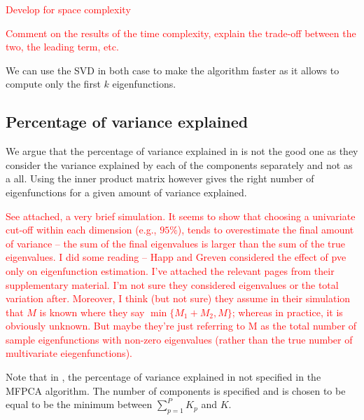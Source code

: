 \textcolor{red}{Develop for space complexity}

\textcolor{red}{Comment on the results of the time complexity, explain the trade-off between the two, the leading term, etc.}

\begin{remark}
We can use the SVD in both case to make the algorithm faster as it allows to compute only the first $k$ eigenfunctions.
\end{remark}


\subsection{Percentage of variance explained} %
\label{sub:percentage_of_variance_explained}

We argue that the percentage of variance explained in \cite{happMultivariateFunctionalPrincipal2015} is not the good one as they consider the variance explained by each of the components separately and not as a all. Using the inner product matrix however gives the right number of eigenfunctions for a given amount of variance explained.

\textcolor{red}{See attached, a very brief simulation. It seems to show that choosing a univariate cut-off within each dimension (e.g., $95\%$), tends to overestimate the final amount of variance – the sum of the final eigenvalues is larger than the sum of the true eigenvalues. I did some reading -- Happ and Greven considered the effect of pve only on eigenfunction estimation. I’ve attached the relevant pages from their supplementary material. I’m not sure they considered eigenvalues or the total variation after. Moreover, I think (but not sure) they assume in their simulation that $M$ is known where they say $\min\{M_1 + M_2, M\}$; whereas in practice, it is obviously unknown. But maybe they’re just referring to M as the total number of sample eigenfunctions with non-zero eigenvalues (rather than the true number of multivariate eiegenfunctions).}

Note that in \cite{happMultivariateFunctionalPrincipal2015}, the percentage of variance explained in not specified in the MFPCA algorithm. The number of components is specified and is chosen to be equal to be the minimum between $\sum_{p = 1}^P K_p$ and $K$.



